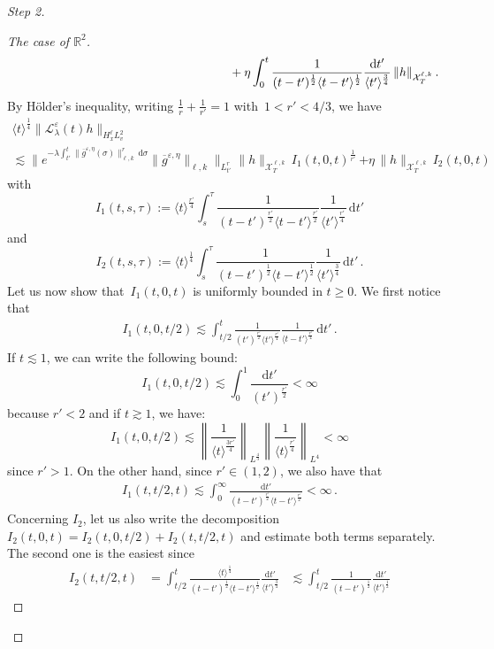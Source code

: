 \documentclass[11pt]{article}
\theoremstyle{definition}
\numberwithin{equation}{section}
\numberwithin{figure}{section}
\numberwithin{table}{section}
\newcommand*{\dd}{\mathrm{d}}
\newcommand*{\dt}{\dd t}
\newcommand*{\dsigma}{\dd \sigma}
\newenvironment{step}[1]{\begin{proof}[#1]}{\let\qed\relax\end{proof}}
\newcommand*\R {\mathbb{R}}
\newcommand*\eps{{\varepsilon}}
\newcommand*\e{{\varepsilon}}
\begin{document}
\begin{step}{Step 2}
\begin{step}{The case of $\R^2$}
\begin{align*}
&\mkern 325mu + { \eta \int_0^t \frac{1}{(t-t')^\frac12 \langle t-t' \rangle^\frac12 } \frac{\dt'}{{\langle t' \rangle^{\frac34}}} \, \|h\|_{\mathcal{X}_T^{\ell,k}} } \,.
\end{align*}
By H\"older's inequality, writing $ \frac1r+\frac1{r'} = 1$ with~$1<r'<4/3$, we have
\begin{multline}\label{LlambdaHell}
\langle t \rangle^\frac{1}{4} \big \| \mathcal{L}_\lambda^{\e}(t) h\big\|_{H^\ell_x L^2_v} \\
\lesssim \Big\| e^{- \lambda \int_{t'}^t \|\overline g^{\eps,\eta}(\sigma)\|_{\ell,k}^r\, \dsigma } \|\overline g^{\eps,\eta}\|_{\ell,k} \Big\|_{L^{r}_{t'}} \|h\|_{\mathcal{X}_T^{\ell,k}}\, I_1(t,0,t)^{\frac1{r' }}\, {+ \eta \, \|h\|_{\mathcal{X}_T^{\ell,k}}\, I_2(t,0,t)}
\end{multline}
with
\[
I_1(t,s,\tau):= \langle t \rangle^{\frac{r'}4} \int_s^\tau \frac{1}{(t-t')^{\frac{r'}2}\langle t-t' \rangle^{\frac{r'}2}}\frac{1}{\langle t' \rangle^{\frac{r'}4}} \, \dt'
\]
and
\[
{I_2(t,s,\tau) := \langle t \rangle^{\frac 14} \int_s^\tau \frac{1}{(t-t')^{\frac{1}2}\langle t-t' \rangle^\frac12}\frac{1}{\langle t' \rangle^{\frac{3}4}} \, \dt' \,.}
\]
Let us now show that~$ I_1(t,0,t)$ is uniformly bounded in $t \ge 0$. We first notice that
\begin{align*}
I_1(t,0,t/2) \lesssim \int_{t/2}^t \frac{1}{(t')^{\frac{r'}2}\langle t' \rangle^{\frac{r'}4}} \frac{1}{\langle t-t' \rangle^{\frac{r'}4}} \, \dt' \,.
\end{align*}
If $t \lesssim 1$, we can write the following bound:
\[
I_1(t,0,t/2)
\lesssim \int_0^1 \frac{\dt'}{(t')^{\frac{r'}2}} < \infty
\]
because $r'<2$ and if $t \gtrsim 1$, we have:
\[
I_1(t,0,t/2) \lesssim \left\| \frac{1}{{\langle t \rangle^{\frac{3r'}4}}} \right\|_{L^{\frac43}} \left\| \frac{1}{{\langle t \rangle^{\frac{r'}4}}} \right\|_{L^4 } < \infty
\]
since $r'>1$. On the other hand, since $r' \in (1,2)$, we also have that
\begin{align*}
I_1(t,t/2,t) \lesssim \int_0^\infty \frac{\dt'}{(t-t')^{\frac{r'}2}\langle t-t' \rangle^{\frac{r'}2}} < \infty \,.
\end{align*}
Concerning $I_2$, let us also write the decomposition~$ I_2(t,0,t)= I_2(t,0,t/2)+ I_2(t,t/2,t)$ and estimate both terms separately. The second one is the easiest since
\[
\begin{aligned} I_2(t,t/2,t) &= \int_{ t/2}^t \frac{\langle t \rangle^{\frac14} }{(t-t')^{\frac12} \langle t-t' \rangle^\frac12}\frac{\dt'}{\langle t' \rangle^{\frac34}} &\lesssim \int_{ t/2}^t \frac{1}{(t-t')^{\frac12}}\frac{\dt'}{\langle t' \rangle^{\frac12}}

\end{aligned}\]
\end{step}
\end{step}
\end{document}
